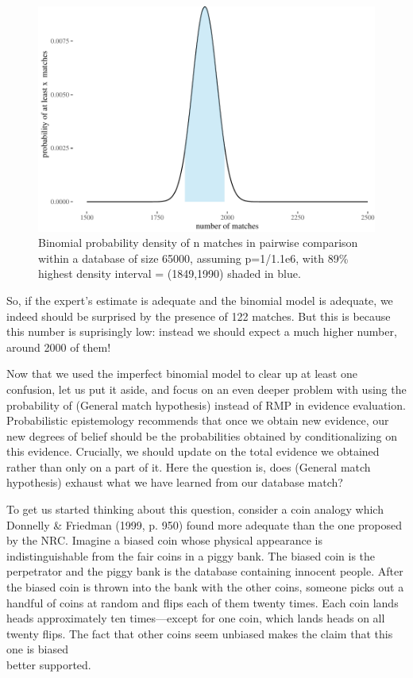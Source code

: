 \documentclass[10pt,dvipsnames,enabledeprecatedfontcommands]{scrartcl}
\begin{document}
\begin{figure}

{\centering \includegraphics[width=1\linewidth]{lr-chapter2_files/figure-latex/unnamed-chunk-9-1} 

}

\caption{Binomial probability density of  n matches in pairwise comparison within a database of size 65000, assuming p=1/1.1e6, with 89\% highest density interval = (1849,1990) shaded in blue.}\label{fig:unnamed-chunk-9}
\end{figure}

So, if the expert's estimate is adequate and the binomial model is
adequate, we indeed should be surprised by the presence of 122 matches.
But this is because this number is suprisingly low: instead we should
expect a much higher number, around 2000 of them!

Now that we used the imperfect binomial model to clear up at least one
confusion, let us put it aside, and focus on an even deeper problem with
using the probability of (General match hypothesis) instead of RMP in
evidence evaluation. Probabilistic epistemology recommends that once we
obtain new evidence, our new degrees of belief should be the
probabilities obtained by conditionalizing on this evidence. Crucially,
we should update on the total evidence we obtained rather than only on a
part of it. Here the question is, does (General match hypothesis)
exhaust what we have learned from our database match?

To get us started thinking about this question, consider a coin analogy
which Donnelly \& Friedman (1999, p. 950) found more adequate than the
one proposed by the NRC. Imagine a biased coin whose physical appearance
is indistinguishable from the fair coins in a piggy bank. The biased
coin is the perpetrator and the piggy bank is the database containing
innocent people. After the biased coin is thrown into the bank with the
other coins, someone picks out a handful of coins at random and flips
each of them twenty times. Each coin lands heads approximately ten
times---except for one coin, which lands heads on all twenty flips. The
fact that other coins seem unbiased makes the claim that this one is
biased\\
better supported.
\end{document}
